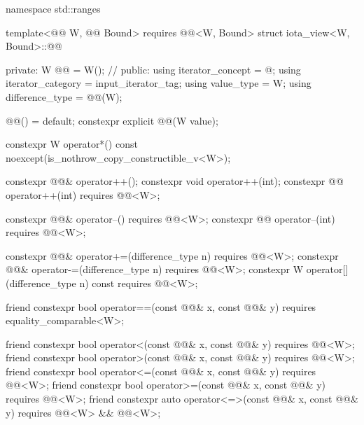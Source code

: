 %
\begin{codeblock}
namespace std::ranges {
  template<@@ W, @@ Bound>
    requires @@<W, Bound>
  struct iota_view<W, Bound>::@@ {
  private:
    W @@ = W();             // \expos
  public:
    using iterator_concept = @\seebelow@;
    using iterator_category = input_iterator_tag;
    using value_type = W;
    using difference_type = @@(W);

    @@() = default;
    constexpr explicit @@(W value);

    constexpr W operator*() const noexcept(is_nothrow_copy_constructible_v<W>);

    constexpr @@& operator++();
    constexpr void operator++(int);
    constexpr @@ operator++(int) requires @@<W>;

    constexpr @@& operator--() requires @@<W>;
    constexpr @@ operator--(int) requires @@<W>;

    constexpr @@& operator+=(difference_type n)
      requires @@<W>;
    constexpr @@& operator-=(difference_type n)
      requires @@<W>;
    constexpr W operator[](difference_type n) const
      requires @@<W>;

    friend constexpr bool operator==(const @@& x, const @@& y)
      requires equality_comparable<W>;

    friend constexpr bool operator<(const @@& x, const @@& y)
      requires @@<W>;
    friend constexpr bool operator>(const @@& x, const @@& y)
      requires @@<W>;
    friend constexpr bool operator<=(const @@& x, const @@& y)
      requires @@<W>;
    friend constexpr bool operator>=(const @@& x, const @@& y)
      requires @@<W>;
    friend constexpr auto operator<=>(const @@& x, const @@& y)
      requires @@<W> && @@<W>;

}}
\end{codeblock}

